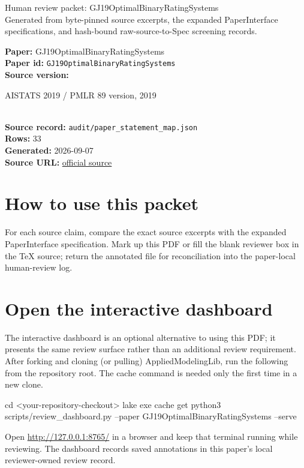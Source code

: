 \documentclass[10pt]{article}
\begin{document}
\fontsize{9}{10}\selectfont

\begin{center}
{\LARGE Human review packet: GJ19OptimalBinaryRatingSystems}\\[0.35em]
\small Generated from byte-pinned source excerpts, the expanded PaperInterface
specifications, and hash-bound raw-source-to-Spec screening records.
\end{center}

\noindent\textbf{Paper:} GJ19OptimalBinaryRatingSystems\\
\textbf{Paper id:} \texttt{GJ19OptimalBinaryRatingSystems}\\
\textbf{Source version:} \parbox[t]{0.76\linewidth}{\raggedright AISTATS 2019 / PMLR 89 version, 2019}\\
\textbf{Source record:} \texttt{audit/paper\_statement\_map.json}\\
\textbf{Rows:} 33\\
\textbf{Generated:} 2026-09-07\\
\textbf{Source URL:} \href{https://proceedings.mlr.press/v89/garg19a.html}{official source}





\section*{How to use this packet}
For each source claim, compare the exact source excerpts with the expanded
PaperInterface specification. Mark up this PDF or fill the blank reviewer box in the TeX source;
return the annotated file for reconciliation into the paper-local human-review
log.

\section*{Open the interactive dashboard}
The interactive dashboard is an optional alternative to using this PDF; it
presents the same review surface rather than an additional review requirement.
After forking and cloning (or pulling) AppliedModelingLib, run the following from the
repository root. The cache command is needed only the first time in a new clone.
\begin{ReviewVerbatim}
cd <your-repository-checkout>
lake exe cache get
python3 scripts/review_dashboard.py --paper GJ19OptimalBinaryRatingSystems --serve
\end{ReviewVerbatim}
Open \url{http://127.0.0.1:8765/} in a browser and keep that terminal running
while reviewing. The dashboard records saved annotations in this paper's local
reviewer-owned review record.
\end{document}
